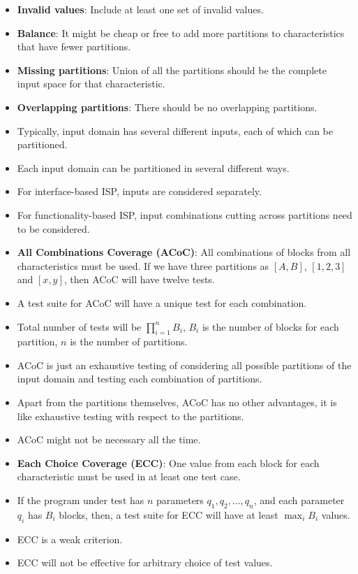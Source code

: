 \documentclass[a4paper]{article}
\begin{document}
\begin{itemize}
    \item \textbf{Invalid values}: Include at least one set of invalid values.
    \item \textbf{Balance}: It might be cheap or free to add more partitions to characteristics that have fewer partitions.
    \item \textbf{Missing partitions}: Union of all the partitions should be the complete input space for that characteristic.
    \item \textbf{Overlapping partitions}: There should be no overlapping partitions.
    \item Typically, input domain has several different inputs, each of which can be partitioned.
    \item Each input domain can be partitioned in several different ways.
    \item For interface-based ISP, inputs are considered separately.
    \item For functionality-based ISP, input combinations cutting across partitions need to be considered.
    \item \textbf{All Combinations Coverage (ACoC)}: All combinations of blocks from all characteristics must be used. If we have three partitions as $[A,B]$, $[1,2,3]$ and $[x,y]$, then ACoC will have twelve tests.
    \item A test suite for ACoC will have a unique test for each combination.
    \item Total number of tests will be $\prod_{i=1}^nB_i$, $B_i$ is the number of blocks for each partition, $n$ is the number of partitions.
    \item ACoC is just an exhaustive testing of considering all possible partitions of the input domain and testing each combination of partitions.
    \item Apart from the partitions themselves, ACoC has no other advantages, it is like exhaustive testing with respect to the partitions.
    \item ACoC might not be necessary all the time.
    \item \textbf{Each Choice Coverage (ECC)}: One value from each block for each characteristic must be used in at least one test case.
    \item If the program under test has $n$ parameters $q_1,q_2,...,q_n$, and each parameter $q_i$ has $B_i$ blocks, then, a test suite for ECC will have at least $\max_iB_i$ values.
    \item ECC is a weak criterion.
    \item ECC will not be effective for arbitrary choice of test values.

\end{itemize}
\end{document}
